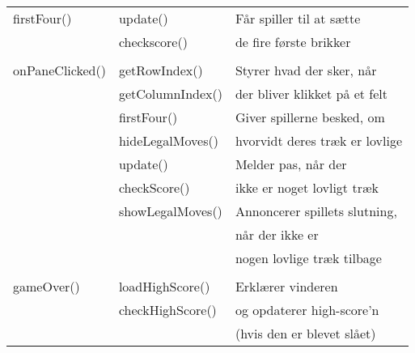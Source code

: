 \begin{table}[H]
\begin{tabular}{lll}
        firstFour()     & update()          & Får spiller til at sætte                                          \\
                        & checkscore()      & de fire første brikker                                            \\
                        &                                                                                       \\

        onPaneClicked() & getRowIndex()     & Styrer hvad der sker, når                                         \\
                        & getColumnIndex()  & der bliver klikket på et felt                                     \\
                        & firstFour()       & Giver spillerne besked, om                                        \\
                        & hideLegalMoves()  & hvorvidt deres træk er lovlige                                    \\
                        & update()          & Melder pas, når der                                               \\
                        & checkScore()      & ikke er noget lovligt træk                                        \\
                        & showLegalMoves()  & Annoncerer spillets slutning,                                     \\
                        &                   & når der ikke er                                                   \\
                        &                   & nogen lovlige træk tilbage                                        \\
                        &                   &                                                                   \\

        gameOver()      & loadHighScore()   & Erklærer vinderen                                                 \\
                        & checkHighScore()  & og opdaterer high-score'n                                         \\
                        &                   & (hvis den er blevet slået)                                        \\


        \bottomrule
    \end{tabular}
\end{table}

